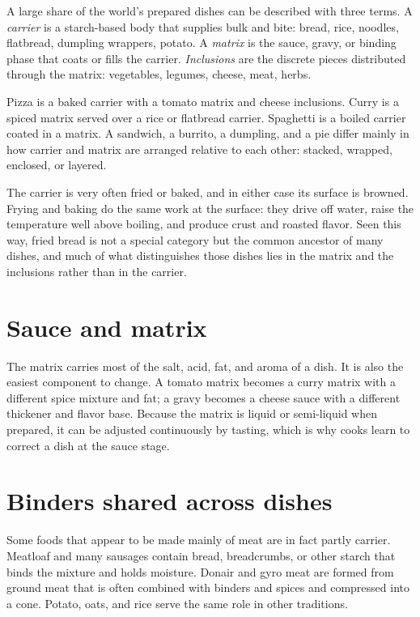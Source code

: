 \documentclass[11pt,openany]{book}
\theoremstyle{definition}
\begin{document}
A large share of the world's prepared dishes can be described with three terms. A \emph{carrier} is a starch-based body that supplies bulk and bite: bread, rice, noodles, flatbread, dumpling wrappers, potato. A \emph{matrix} is the sauce, gravy, or binding phase that coats or fills the carrier. \emph{Inclusions} are the discrete pieces distributed through the matrix: vegetables, legumes, cheese, meat, herbs.

Pizza is a baked carrier with a tomato matrix and cheese inclusions. Curry is a spiced matrix served over a rice or flatbread carrier. Spaghetti is a boiled carrier coated in a matrix. A sandwich, a burrito, a dumpling, and a pie differ mainly in how carrier and matrix are arranged relative to each other: stacked, wrapped, enclosed, or layered.

The carrier is very often fried or baked, and in either case its surface is browned. Frying and baking do the same work at the surface: they drive off water, raise the temperature well above boiling, and produce crust and roasted flavor. Seen this way, fried bread is not a special category but the common ancestor of many dishes, and much of what distinguishes those dishes lies in the matrix and the inclusions rather than in the carrier.

\section{Sauce and matrix}

The matrix carries most of the salt, acid, fat, and aroma of a dish. It is also the easiest component to change. A tomato matrix becomes a curry matrix with a different spice mixture and fat; a gravy becomes a cheese sauce with a different thickener and flavor base. Because the matrix is liquid or semi-liquid when prepared, it can be adjusted continuously by tasting, which is why cooks learn to correct a dish at the sauce stage.

\section{Binders shared across dishes}

Some foods that appear to be made mainly of meat are in fact partly carrier. Meatloaf and many sausages contain bread, breadcrumbs, or other starch that binds the mixture and holds moisture. Donair and gyro meat are formed from ground meat that is often combined with binders and spices and compressed into a cone. Potato, oats, and rice serve the same role in other traditions.
\end{document}
